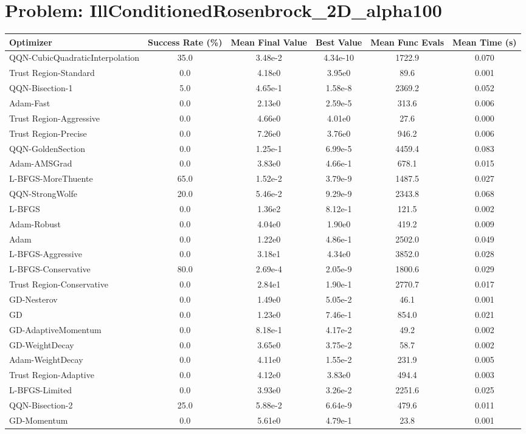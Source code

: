 \documentclass{article}
\begin{document}
\section{Problem: IllConditionedRosenbrock\_2D\_alpha100}
\begin{longtable}{p{3cm}*{5}{c}}
\toprule
\textbf{Optimizer} & \textbf{Success Rate (\%)} & \textbf{Mean Final Value} & \textbf{Best Value} & \textbf{Mean Func Evals} & \textbf{Mean Time (s)} \\
\midrule
QQN-CubicQuadraticInterpolation & 35.0 & 3.48e-2 & 4.34e-10 & 1722.9 & 0.070 \\
Trust Region-Standard & 0.0 & 4.18e0 & 3.95e0 & 89.6 & 0.001 \\
QQN-Bisection-1 & 5.0 & 4.65e-1 & 1.58e-8 & 2369.2 & 0.052 \\
Adam-Fast & 0.0 & 2.13e0 & 2.59e-5 & 313.6 & 0.006 \\
Trust Region-Aggressive & 0.0 & 4.66e0 & 4.01e0 & 27.6 & 0.000 \\
Trust Region-Precise & 0.0 & 7.26e0 & 3.76e0 & 946.2 & 0.006 \\
QQN-GoldenSection & 0.0 & 1.25e-1 & 6.99e-5 & 4459.4 & 0.083 \\
Adam-AMSGrad & 0.0 & 3.83e0 & 4.66e-1 & 678.1 & 0.015 \\
L-BFGS-MoreThuente & 65.0 & 1.52e-2 & 3.79e-9 & 1487.5 & 0.027 \\
QQN-StrongWolfe & 20.0 & 5.46e-2 & 9.29e-9 & 2343.8 & 0.068 \\
L-BFGS & 0.0 & 1.36e2 & 8.12e-1 & 121.5 & 0.002 \\
Adam-Robust & 0.0 & 4.04e0 & 1.90e0 & 419.2 & 0.009 \\
Adam & 0.0 & 1.22e0 & 4.86e-1 & 2502.0 & 0.049 \\
L-BFGS-Aggressive & 0.0 & 3.18e1 & 4.34e0 & 3852.0 & 0.028 \\
L-BFGS-Conservative & 80.0 & 2.69e-4 & 2.05e-9 & 1800.6 & 0.029 \\
Trust Region-Conservative & 0.0 & 2.84e1 & 1.90e-1 & 2770.7 & 0.017 \\
GD-Nesterov & 0.0 & 1.49e0 & 5.05e-2 & 46.1 & 0.001 \\
GD & 0.0 & 1.23e0 & 7.46e-1 & 854.0 & 0.021 \\
GD-AdaptiveMomentum & 0.0 & 8.18e-1 & 4.17e-2 & 49.2 & 0.002 \\
GD-WeightDecay & 0.0 & 3.65e0 & 3.75e-2 & 58.7 & 0.002 \\
Adam-WeightDecay & 0.0 & 4.11e0 & 1.55e-2 & 231.9 & 0.005 \\
Trust Region-Adaptive & 0.0 & 4.12e0 & 3.83e0 & 494.4 & 0.003 \\
L-BFGS-Limited & 0.0 & 3.93e0 & 3.26e-2 & 2251.6 & 0.025 \\
QQN-Bisection-2 & 25.0 & 5.88e-2 & 6.64e-9 & 479.6 & 0.011 \\
GD-Momentum & 0.0 & 5.61e0 & 4.79e-1 & 23.8 & 0.001 \\
\bottomrule
\end{longtable}
\end{document}
